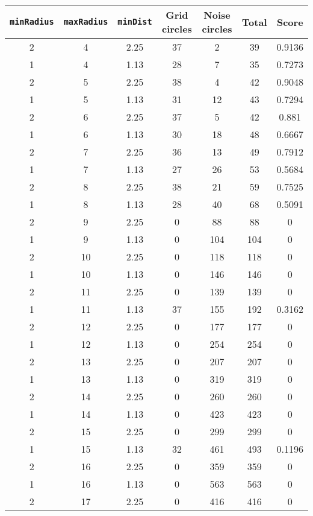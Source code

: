 \documentclass[letterpaper, 12pt]{article}
\begin{document}
\begin{longtable}{|c|c|c|c|c|c|c|}
\hline
\textbf{\texttt{minRadius}} & \textbf{\texttt{maxRadius}} & \textbf{\texttt{minDist}} & \textbf{Grid circles} & \textbf{Noise circles} & \textbf{Total} & \textbf{Score} \\
\hline
2 & 4 & 2.25 & 37 & 2 & 39 & 0.9136 \\
\hline
1 & 4 & 1.13 & 28 & 7 & 35 & 0.7273 \\
\hline
2 & 5 & 2.25 & 38 & 4 & 42 & 0.9048 \\
\hline
1 & 5 & 1.13 & 31 & 12 & 43 & 0.7294 \\
\hline
2 & 6 & 2.25 & 37 & 5 & 42 & 0.881 \\
\hline
1 & 6 & 1.13 & 30 & 18 & 48 & 0.6667 \\
\hline
2 & 7 & 2.25 & 36 & 13 & 49 & 0.7912 \\
\hline
1 & 7 & 1.13 & 27 & 26 & 53 & 0.5684 \\
\hline
2 & 8 & 2.25 & 38 & 21 & 59 & 0.7525 \\
\hline
1 & 8 & 1.13 & 28 & 40 & 68 & 0.5091 \\
\hline
2 & 9 & 2.25 & 0 & 88 & 88 & 0 \\
\hline
1 & 9 & 1.13 & 0 & 104 & 104 & 0 \\
\hline
2 & 10 & 2.25 & 0 & 118 & 118 & 0 \\
\hline
1 & 10 & 1.13 & 0 & 146 & 146 & 0 \\
\hline
2 & 11 & 2.25 & 0 & 139 & 139 & 0 \\
\hline
1 & 11 & 1.13 & 37 & 155 & 192 & 0.3162 \\
\hline
2 & 12 & 2.25 & 0 & 177 & 177 & 0 \\
\hline
1 & 12 & 1.13 & 0 & 254 & 254 & 0 \\
\hline
2 & 13 & 2.25 & 0 & 207 & 207 & 0 \\
\hline
1 & 13 & 1.13 & 0 & 319 & 319 & 0 \\
\hline
2 & 14 & 2.25 & 0 & 260 & 260 & 0 \\
\hline
1 & 14 & 1.13 & 0 & 423 & 423 & 0 \\
\hline
2 & 15 & 2.25 & 0 & 299 & 299 & 0 \\
\hline
1 & 15 & 1.13 & 32 & 461 & 493 & 0.1196 \\
\hline
2 & 16 & 2.25 & 0 & 359 & 359 & 0 \\
\hline
1 & 16 & 1.13 & 0 & 563 & 563 & 0 \\
\hline
2 & 17 & 2.25 & 0 & 416 & 416 & 0 \\
\hline

\end{longtable}
\end{document}
